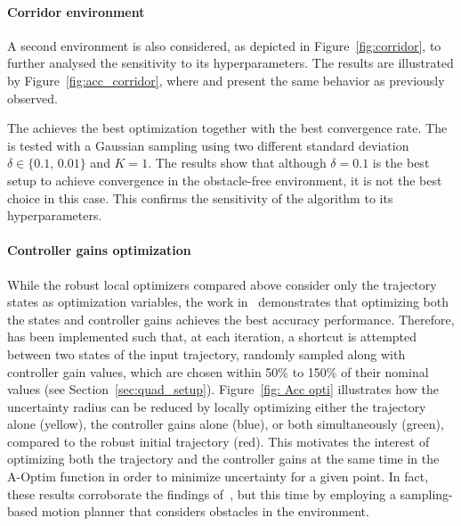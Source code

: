 \paragraph{Corridor environment}

A second environment is also considered, as depicted in Figure~\ref{fig:corridor}, to further analysed the  sensitivity to its hyperparameters.
The results are illustrated by Figure~\ref{fig:acc_corridor}, where  and  present the same behavior as previously observed.

The  achieves the best optimization together with the best convergence rate.
The  is tested with a Gaussian sampling using two different standard deviation $\delta \in \{0.1, \, 0.01\}$ and $K = 1$.
The results show that although $\delta = 0.1$ is the best setup to achieve convergence in the obstacle-free environment, it is not the best choice in this case.
This confirms the sensitivity of the algorithm to its hyperparameters.

\paragraph{Controller gains optimization}

While the robust local optimizers compared above consider only the trajectory states as optimization variables, the work in~\cite{AliIROS} demonstrates that optimizing both the states and controller gains achieves the best accuracy performance.
Therefore,  has been implemented such that, at each iteration, a shortcut is attempted between two states of the input trajectory, randomly sampled along with controller gain values, which are chosen within 50\% to 150\% of their nominal values (see Section~\ref{sec:quad_setup}).
Figure~\ref{fig: Acc opti} illustrates how the uncertainty radius can be reduced by locally optimizing either the trajectory alone (yellow), the controller gains alone (blue), or both simultaneously (green), compared to the robust initial trajectory (red).
This motivates the interest of optimizing both the trajectory and the controller gains at the same time in the A-Optim function in order to minimize uncertainty for a given point. 
In fact, these results corroborate the findings of~\cite{AliIROS}, but this time by employing a sampling-based motion planner that considers obstacles in the environment.

